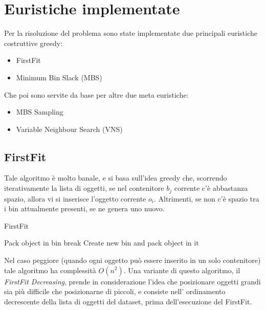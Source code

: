 \documentclass{article}
\begin{document}
\section{Euristiche implementate}
Per la risoluzione del problema sono state implementate due principali euristiche costruttive greedy:

\begin{itemize}
\item FirstFit
\item Minimum Bin Slack (MBS)
\end{itemize}

Che poi sono servite da base per altre due meta euristiche:

\begin{itemize}
\item MBS Sampling
\item Variable Neighbour Search (VNS)
\end{itemize} 

\subsection{FirstFit}
Tale algoritmo è molto banale, e si basa sull'idea greedy che, scorrendo iterativamente la lista di oggetti, se nel contenitore $b_j$ corrente c'è abbastanza spazio, allora vi si inserisce l'oggetto corrente $o_i$. Altrimenti, se non c'è spazio tra i bin attualmente presenti, se ne genera uno nuovo.
\newline
\begin{algorithm}
\caption{FirstFit}\label{FirstFit}
\begin{algorithmic}[1]
\State Pack object in bin
\State break
\EndIf
{}
\EndFor
{}
\State Create new bin and pack object in it
\EndIf 
{}
\EndFor
{}
\end{algorithmic}
\end{algorithm}
\newline
\newline
\newline
Nel caso peggiore (quando ogni oggetto può essere inserito in un solo contenitore) tale algoritmo ha complessità $O(n^2)$.
\newline
\newline
Una variante di questo algoritmo, il \textit{FirstFit Decreasing}, prende in considerazione l'idea che posizionare oggetti grandi sia più difficile che posizionarne di piccoli, e consiste nell' ordinamento decrescente della lista di oggetti del dataset, prima dell'esecuzione del FirstFit. 
\end{document}
